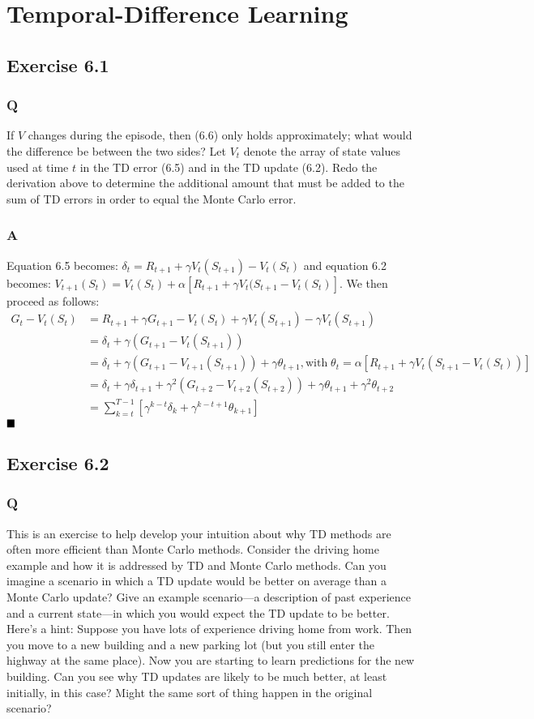 \section{Temporal-Difference Learning}
\subsection{Exercise 6.1}
\subsubsection{Q}
If $V$ changes during the episode, then (6.6) only holds approximately; what would the difference be between the two sides? Let $V_t$ denote the array of state values
used at time $t$ in the TD error (6.5) and in the TD update (6.2). Redo the derivation above to determine the additional amount that must be added to the sum of TD errors in order to equal the Monte Carlo error.
\subsubsection{A}
Equation 6.5 becomes: $\delta_t = R_{t+1} + \gamma V_t(S_{t+1}) - V_t(S_t)$ and equation 6.2 becomes: $V_{t+1}(S_t) = V_t(S_t) + \alpha \left[R_{t+1} + \gamma V_t(S_{t+1} - V_t(S_t)\right]$. We then proceed as follows:
\begin{align}
G_t - V_t(S_t) &= R_{t+1} + \gamma G_{t+1} - V_t(S_t) + \gamma V_t(S_{t+1}) - \gamma V_t(S_{t+1}) \\
&= \delta_t + \gamma(G_{t+1} - V_t(S_{t+1})) \\
&= \delta_t + \gamma(G_{t+1} - V_{t+1}(S_{t+1})) + \gamma \theta_{t+1}, \text{with} \; \theta_{t} = \alpha \left[R_{t+1} + \gamma V_t(S_{t+1} - V_t(S_t))\right] \\
&= \delta_t + \gamma \delta_{t+1} + \gamma^2(G_{t+2} - V_{t+2}(S_{t+2})) + \gamma \theta_{t+1} + \gamma^2 \theta_{t+2} \\
&= \sum_{k=t}^{T-1} \left[\gamma^{k-t} \delta_k + \gamma^{k-t+1} \theta_{k+1}\right]
\end{align}
$
\hfill \blacksquare
$

\subsection{Exercise 6.2}
\subsubsection{Q}
This is an exercise to help develop your intuition about why TD methods are often more efficient than Monte Carlo methods. Consider the driving home example and how it is addressed by TD and Monte Carlo methods. Can you imagine a scenario in which a TD update would be better on average than a Monte Carlo update? Give an example scenario—a description of past experience and a current state—in which you would expect the TD update to be better. Here’s a hint: Suppose you have lots of experience driving home from work. Then you move to a new building and a new parking lot (but you still enter the highway at the same place). Now you are starting to learn predictions for the new building. Can you see why TD updates are likely to be much better, at least initially, in this case? Might the same sort of thing happen in the original scenario?
